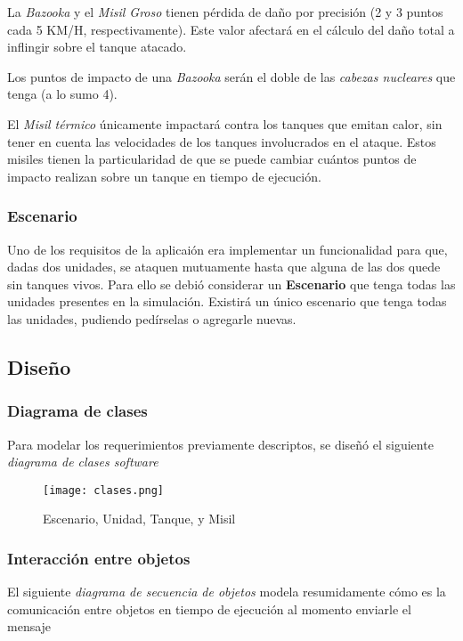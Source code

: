 La \emph{Bazooka} y el \emph{Misil Groso} tienen pérdida de daño por precisión (2 y 3 puntos cada 5 KM/H, respectivamente). Este valor afectará en el cálculo del daño total a inflingir sobre el tanque atacado. 

Los puntos de impacto de una \emph{Bazooka} serán el doble de las \emph{cabezas nucleares} que tenga (a lo sumo 4).  

El \emph{Misil térmico} únicamente impactará contra los tanques que emitan calor, sin tener en cuenta las velocidades de los tanques involucrados en el ataque. Estos misiles tienen la particularidad de que se puede cambiar cuántos puntos de impacto realizan sobre un tanque en tiempo de ejecución.

\subsubsection{Escenario}

Uno de los requisitos de la aplicaión era implementar un funcionalidad para que, dadas dos unidades, se ataquen mutuamente hasta que alguna de las dos quede sin tanques vivos. Para ello se debió considerar un \textbf{Escenario} que tenga todas las unidades presentes en la simulación. Existirá un único escenario que tenga todas las unidades, pudiendo pedírselas o agregarle nuevas.

\subsection{Diseño}

\subsubsection{Diagrama de clases}

Para modelar los requerimientos previamente descriptos, se diseñó el siguiente \emph{diagrama de clases software} 

\begin{figure}[H]
    \centering
    \texttt{[image: clases.png]}
    \caption{Escenario, Unidad, Tanque, y Misil}
\end{figure}

\subsubsection{Interacción entre objetos}

El siguiente \emph{diagrama de secuencia de objetos} modela resumidamente cómo es la comunicación entre objetos en tiempo de ejecución al momento enviarle el mensaje 

